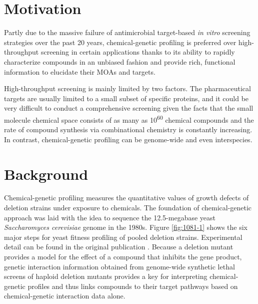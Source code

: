 \documentclass[12pt,fullpage,singlespace]{article}
\begin{document}
\section{Motivation}

Partly due to the massive failure of antimicrobial target-based \textit{in vitro} screening strategies over the past 20 years, chemical-genetic profiling is preferred over high-throughput screening in certain applications thanks to its ability to rapidly characterize compounds in an unbiased fashion and provide rich, functional information to elucidate their MOAs and targets.

High-throughput screening is mainly limited by two factors. The pharmaceutical targets are usually limited to a small subset of specific proteins, and it could be very difficult to conduct a comprehensive screening given the facts that the small molecule chemical space consists of as many as 10\textsuperscript{60} chemical compounds \citep{1104} and the rate of compound synthesis via combinational chemistry is constantly increasing. In contrast, chemical-genetic profiling can be genome-wide and even interspecies.

\section{Background}

Chemical-genetic profiling measures the quantitative values of growth defects of deletion strains under exposure to chemicals. The foundation of chemical-genetic approach was laid with the idea to sequence the 12.5-megabase yeast \textit{Saccharomyces cerevisiae} genome in the 1980s. Figure \ref{fig:1081-1} shows the six major steps for yeast fitness profiling of pooled deletion strains. Experimental detail can be found in the original publication \citep{1081}. Because a deletion mutant provides a model for the effect of a compound that inhibits the gene product, genetic interaction information obtained from genome-wide synthetic lethal screens of haploid deletion mutants provides a key for interpreting chemical-genetic profiles and thus links compounds to their target pathways based on chemical-genetic interaction data alone.
\end{document}
